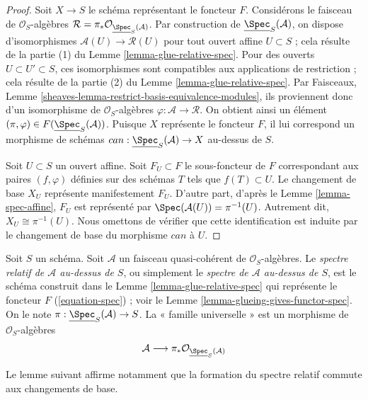 \begin{proof}
Soit $X \to S$ le schéma représentant le foncteur $F$.
Considérons le faisceau de $\mathcal{O}_S$-algèbres
$\mathcal{R} = \pi_*\mathcal{O}_{\underline{\Spec}_S(\mathcal{A})}$.
Par construction de $\underline{\Spec}_S(\mathcal{A})$,
on dispose d'isomorphismes $\mathcal{A}(U) \to \mathcal{R}(U)$
pour tout ouvert affine $U \subset S$ ; cela résulte de la partie (1) du
Lemme \ref{lemma-glue-relative-spec}.
Pour des ouverts $U \subset U' \subset S$, ces isomorphismes sont
compatibles aux applications de restriction ; cela résulte de la partie (2) du
Lemme \ref{lemma-glue-relative-spec}.
Par Faisceaux, Lemme \ref{sheaves-lemma-restrict-basis-equivalence-modules},
ils proviennent donc d'un isomorphisme de $\mathcal{O}_S$-algèbres
$\varphi : \mathcal{A} \to \mathcal{R}$. On obtient ainsi un élément
$(\pi, \varphi) \in F(\underline{\Spec}_S(\mathcal{A}))$.
Puisque $X$ représente le foncteur $F$, il lui correspond un
morphisme de schémas $can : \underline{\Spec}_S(\mathcal{A}) \to X$
au-dessus de $S$.

\medskip\noindent
Soit $U \subset S$ un ouvert affine. Soit $F_U \subset F$ le
sous-foncteur de $F$ correspondant aux paires $(f, \varphi)$ définies sur des
schémas $T$ tels que $f(T) \subset U$. Le changement de base
$X_U$ représente manifestement $F_U$. D'autre part, d'après le
Lemme \ref{lemma-spec-affine}, $F_U$ est représenté par
$\Spec(\mathcal{A}(U)) = \pi^{-1}(U)$. Autrement dit, $X_U \cong \pi^{-1}(U)$.
Nous omettons de vérifier que cette identification est induite par le
changement de base du morphisme $can$ à $U$.
\end{proof}

\begin{definition}
\label{definition-relative-spec}
Soit $S$ un schéma. Soit $\mathcal{A}$ un faisceau quasi-cohérent de
$\mathcal{O}_S$-algèbres. Le {\it spectre relatif de $\mathcal{A}$ au-dessus de
$S$}, ou simplement le {\it spectre de $\mathcal{A}$ au-dessus de $S$}, est le schéma
construit dans le Lemme \ref{lemma-glue-relative-spec} qui représente le
foncteur $F$ (\ref{equation-spec}) ; voir le
Lemme \ref{lemma-glueing-gives-functor-spec}.
On le note $\pi : \underline{\Spec}_S(\mathcal{A}) \to S$.
La « famille universelle » est un morphisme de $\mathcal{O}_S$-algèbres
$$
\mathcal{A}
\longrightarrow
\pi_*\mathcal{O}_{\underline{\Spec}_S(\mathcal{A})}
$$
\end{definition}

\noindent
Le lemme suivant affirme notamment que la formation du spectre relatif
commute aux changements de base.

